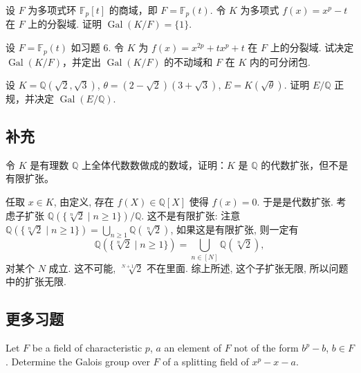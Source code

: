 \setcounter{pb}{6}
\begin{problem}
    设 $ F $ 为多项式环 $ \mathbb{F}_p[t] $ 的商域，即 $ F = \mathbb{F}_p(t) $. 
    令 $ K $ 为多项式 $ f(x) = x^p - t $ 在 $ F $ 上的分裂域. 
    证明 $ \operatorname{Gal}(K/F) = \{1\} $.
\end{problem}

\begin{problem}
    设 $ F = \mathbb{F}_p(t) $ 如习题 6. 
    令 $ K $ 为 $ f(x) = x^{2p} + t x^p + t $ 在 $ F $ 上的分裂域. 
    试决定 $ \operatorname{Gal}(K/F) $，并定出 $ \operatorname{Gal}(K/F) $ 的不动域和 $ F $ 在 $ K $ 内的可分闭包. 
\end{problem}

\setcounter{pb}{14}
\begin{problem}
    设 $ K = \mathbb{Q}(\sqrt{2}, \sqrt{3}) $, $ \theta = (2 - \sqrt{2})(3 + \sqrt{3}) $, $ E = K(\sqrt{\theta}) $.
    证明 $ E/\mathbb{Q} $ 正规，并决定 $ \operatorname{Gal}(E/\mathbb{Q}) $.
\end{problem}


\subsection{补充}
\setcounter{pb}{1}
\begin{problem}
令 $K$ 是有理数 $\mathbb{Q}$ 上全体代数数做成的数域，证明：$K$ 是 $\mathbb{Q}$ 的代数扩张，但不是有限扩张。
\end{problem}

\begin{solution}
    任取 $x\in K$, 由定义, 存在 $f(X)\in\mathbb{Q}[X]$ 使得 $f(x)=0$. 于是是代数扩张. 
    考虑子扩张 $\mathbb{Q}(\{\sqrt[n]{2}\mid n\geq1 \})/\mathbb{Q}$. 
    这不是有限扩张: 注意 $\mathbb{Q}(\{\sqrt[n]{2}\mid n\geq1 \})=\bigcup_{n\geq1}\mathbb{Q}(\sqrt[n]{2})$, 
    如果这是有限扩张, 则一定有 
        \[
            \mathbb{Q}(\{\sqrt[n]{2}\mid n\geq1 \})=\bigcup_{n\in[N]}\mathbb{Q}(\sqrt[n]{2}),
        \]
    对某个 $N$ 成立. 这不可能, $\sqrt[N+1]{2}$ 不在里面. 综上所述, 这个子扩张无限, 所以问题中的扩张无限. 
\end{solution}

\subsection{更多习题}
\setcounter{pb}{1}
\begin{problem}
Let $F$ be a field of characteristic $p$, $a$ an element of $F$ not of the form $b^p - b$, $b \in F$. Determine the Galois group over $F$ of a splitting field of $x^p - x - a$.
\end{problem}

